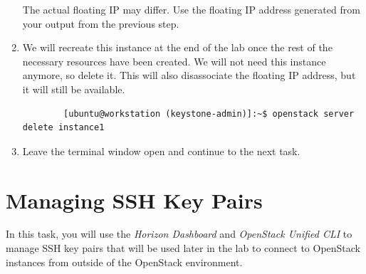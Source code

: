 \documentclass[letterpaper, 12pt]{article}
\begin{document}
\begin{enumerate}
    \begin{notebox}
        The actual floating IP may differ. Use the floating IP address generated from your output from the previous
        step.
    \end{notebox}

    \item We will recreate this instance at the end of the lab once the rest of the necessary resources have been
    created. We will not need this instance anymore, so delete it. This will also disassociate the floating IP address,
    but it will still be available.
    \begin{lstlisting}
        [ubuntu@workstation (keystone-admin)]:~$ openstack server delete instance1
    \end{lstlisting}

    \item Leave the terminal window open and continue to the next task.

\end{enumerate}

\section{Managing SSH Key Pairs}
\label{sec:managing_ssh_key_pairs}
In this task, you will use the \textit{Horizon Dashboard} and \textit{OpenStack Unified CLI} to manage SSH key pairs
that will be used later in the lab to connect to OpenStack instances from outside of the OpenStack environment.
\end{document}
